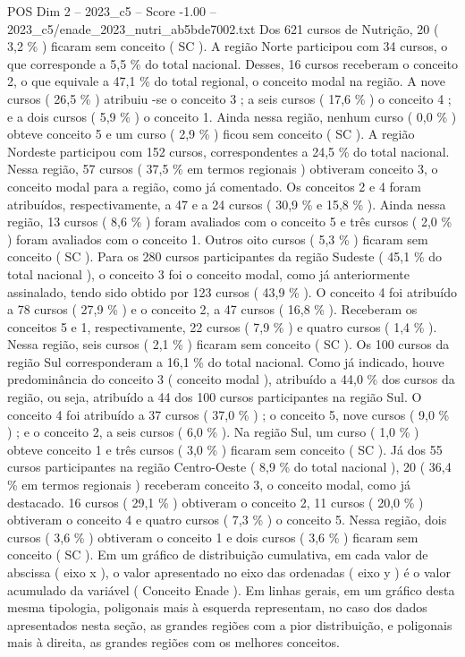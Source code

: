 \begin{textsample}{POS Dim 2 – 2023\_c5 – Score -1.00 – 2023\_c5/enade\_2023\_nutri\_ab5bde7002.txt}
Dos 621 cursos de Nutrição, 20 ( 3,2 \% ) ficaram sem conceito ( SC ).
A região Norte participou com 34 cursos, o que corresponde a 5,5 \% do total nacional.
Desses, 16 cursos receberam o conceito 2, o que equivale a 47,1 \% do total regional, o conceito modal na região.
A nove cursos ( 26,5 \% ) atribuiu -se o conceito 3 ; a seis cursos ( 17,6 \% ) o conceito 4 ; e a dois cursos ( 5,9 \% ) o conceito 1.
Ainda nessa região, nenhum curso ( 0,0 \% ) obteve conceito 5 e um curso ( 2,9 \% ) ficou sem conceito ( SC ).
A região Nordeste participou com 152 cursos, correspondentes a 24,5 \% do total nacional.
Nessa região, 57 cursos ( 37,5 \% em termos regionais ) obtiveram conceito 3, o conceito modal para a região, como já comentado.
Os conceitos 2 e 4 foram atribuídos, respectivamente, a 47 e a 24 cursos ( 30,9 \% e 15,8 \% ).
Ainda nessa região, 13 cursos ( 8,6 \% ) foram avaliados com o conceito 5 e três cursos ( 2,0 \% ) foram avaliados com o conceito 1.
Outros oito cursos ( 5,3 \% ) ficaram sem conceito ( SC ).
Para os 280 cursos participantes da região Sudeste ( 45,1 \% do total nacional ), o conceito 3 foi o conceito modal, como já anteriormente assinalado, tendo sido obtido por 123 cursos ( 43,9 \% ).
O conceito 4 foi atribuído a 78 cursos ( 27,9 \% ) e o conceito 2, a 47 cursos ( 16,8 \% ).
Receberam os conceitos 5 e 1, respectivamente, 22 cursos ( 7,9 \% ) e quatro cursos ( 1,4 \% ).
Nessa região, seis cursos ( 2,1 \% ) ficaram sem conceito ( SC ).
Os 100 cursos da região Sul corresponderam a 16,1 \% do total nacional.
Como já indicado, houve predominância do conceito 3 ( conceito modal ), atribuído a 44,0 \% dos cursos da região, ou seja, atribuído a 44 dos 100 cursos participantes na região Sul.
O conceito 4 foi atribuído a 37 cursos ( 37,0 \% ) ; o conceito 5, nove cursos ( 9,0 \% ) ; e o conceito 2, a seis cursos ( 6,0 \% ).
Na região Sul, um curso ( 1,0 \% ) obteve conceito 1 e três cursos ( 3,0 \% ) ficaram sem conceito ( SC ).
Já dos 55 cursos participantes na região Centro-Oeste ( 8,9 \% do total nacional ), 20 ( 36,4 \% em termos regionais ) receberam conceito 3, o conceito modal, como já destacado. 16 cursos ( 29,1 \% ) obtiveram o conceito 2, 11 cursos ( 20,0 \% ) obtiveram o conceito 4 e quatro cursos ( 7,3 \% ) o conceito 5.
Nessa região, dois cursos ( 3,6 \% ) obtiveram o conceito 1 e dois cursos ( 3,6 \% ) ficaram sem conceito ( SC ).
Em um gráfico de distribuição cumulativa, em cada valor de abscissa ( eixo x ), o valor apresentado no eixo das ordenadas ( eixo y ) é o valor acumulado da variável ( Conceito Enade ).
Em linhas gerais, em um gráfico desta mesma tipologia, poligonais mais à esquerda representam, no caso dos dados apresentados nesta seção, as grandes regiões com a pior distribuição, e poligonais mais à direita, as grandes regiões com os melhores conceitos.

\end{textsample}
